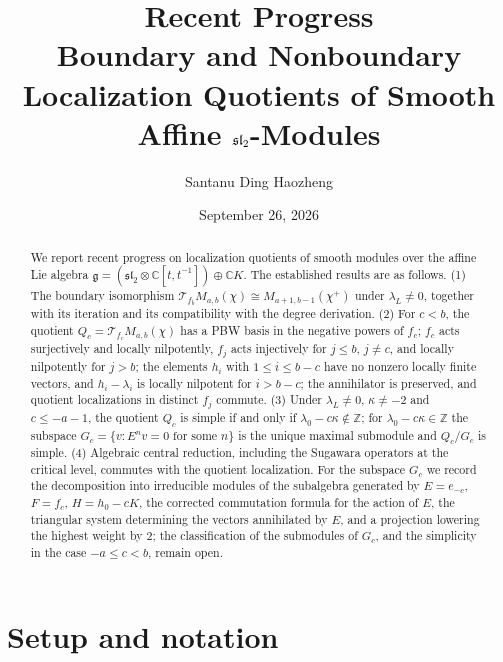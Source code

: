 \documentclass[11pt,a4paper]{article}
\title{Recent Progress\\[3pt]
  \large Boundary and Nonboundary Localization Quotients of Smooth Affine
  \texorpdfstring{\(\slc\)}{sl2}-Modules}
\author{Santanu \quad Ding Haozheng}
\date{September 26, 2026}
\newcommand{\C}{\mathbb C}
\newcommand{\Z}{\mathbb Z}
\newcommand{\g}{\mathfrak g}
\newcommand{\slc}{\mathfrak{sl}_2}
\newcommand{\T}{\mathcal T}
\begin{document}
\maketitle

\begin{abstract}
We report recent progress on localization quotients of smooth modules over
the affine Lie algebra $\g=(\slc\otimes\C[t,t^{-1}])\oplus\C K$.
The established results are as follows. (1) The boundary isomorphism
$\T_{f_b}M_{a,b}(\chi)\cong M_{a+1,b-1}(\chi^+)$ under $\lambda_L\ne0$,
together with its iteration and its compatibility with the degree
derivation. (2) For $c<b$, the quotient $Q_c=\T_{f_c}M_{a,b}(\chi)$ has a
PBW basis in the negative powers of $f_c$; $f_c$ acts surjectively and
locally nilpotently, $f_j$ acts injectively for $j\le b$, $j\ne c$, and
locally nilpotently for $j>b$; the elements $h_i$ with $1\le i\le b-c$
have no nonzero locally finite vectors, and $h_i-\lambda_i$ is locally
nilpotent for $i>b-c$; the annihilator is preserved, and quotient
localizations in distinct $f_j$ commute. (3) Under $\lambda_L\ne0$,
$\kappa\ne-2$ and $c\le-a-1$, the quotient $Q_c$ is simple if and only if
$\lambda_0-c\kappa\notin\Z$; for $\lambda_0-c\kappa\in\Z$ the subspace
$G_c=\{v:E^nv=0\text{ for some }n\}$ is the unique maximal submodule and
$Q_c/G_c$ is simple. (4) Algebraic central reduction, including the
Sugawara operators at the critical level, commutes with the quotient
localization. For the subspace $G_c$ we record the decomposition into
irreducible modules of the subalgebra generated by $E=e_{-c}$, $F=f_c$,
$H=h_0-cK$, the corrected commutation formula for the action of $E$, the
triangular system determining the vectors annihilated by $E$, and a
projection lowering the highest weight by $2$; the classification of the
submodules of $G_c$, and the simplicity in the case $-a\le c<b$, remain
open.
\end{abstract}

\section{Setup and notation}
\label{sec:setup}
\end{document}
